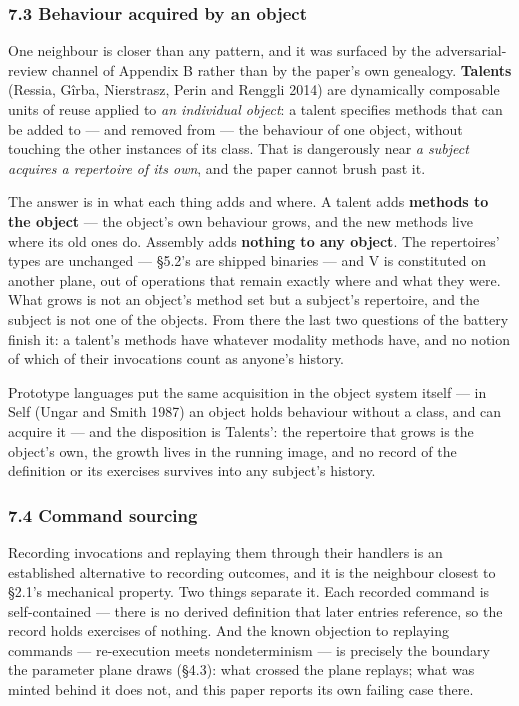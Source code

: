 \documentclass[
]{article}
\begin{document}
\subsubsection{7.3 Behaviour acquired by an
object}\label{behaviour-acquired-by-an-object}

One neighbour is closer than any pattern, and it was surfaced by the
adversarial-review channel of Appendix B rather than by the paper's own
genealogy. \textbf{Talents} (Ressia, Gîrba, Nierstrasz, Perin and
Renggli 2014) are dynamically composable units of reuse applied to
\emph{an individual object}: a talent specifies methods that can be
added to --- and removed from --- the behaviour of one object, without
touching the other instances of its class. That is dangerously near
\emph{a subject acquires a repertoire of its own}, and the paper cannot
brush past it.

The answer is in what each thing adds and where. A talent adds
\textbf{methods to the object} --- the object's own behaviour grows, and
the new methods live where its old ones do. Assembly adds
\textbf{nothing to any object}. The repertoires' types are unchanged ---
§5.2's are shipped binaries --- and V is constituted on another plane,
out of operations that remain exactly where and what they were. What
grows is not an object's method set but a subject's repertoire, and the
subject is not one of the objects. From there the last two questions of
the battery finish it: a talent's methods have whatever modality methods
have, and no notion of which of their invocations count as anyone's
history.

Prototype languages put the same acquisition in the object system itself
--- in Self (Ungar and Smith 1987) an object holds behaviour without a
class, and can acquire it --- and the disposition is Talents': the
repertoire that grows is the object's own, the growth lives in the
running image, and no record of the definition or its exercises survives
into any subject's history.

\subsubsection{7.4 Command sourcing}\label{command-sourcing}

Recording invocations and replaying them through their handlers is an
established alternative to recording outcomes, and it is the neighbour
closest to §2.1's mechanical property. Two things separate it. Each
recorded command is self-contained --- there is no derived definition
that later entries reference, so the record holds exercises of nothing.
And the known objection to replaying commands --- re-execution meets
nondeterminism --- is precisely the boundary the parameter plane draws
(§4.3): what crossed the plane replays; what was minted behind it does
not, and this paper reports its own failing case there.
\end{document}
